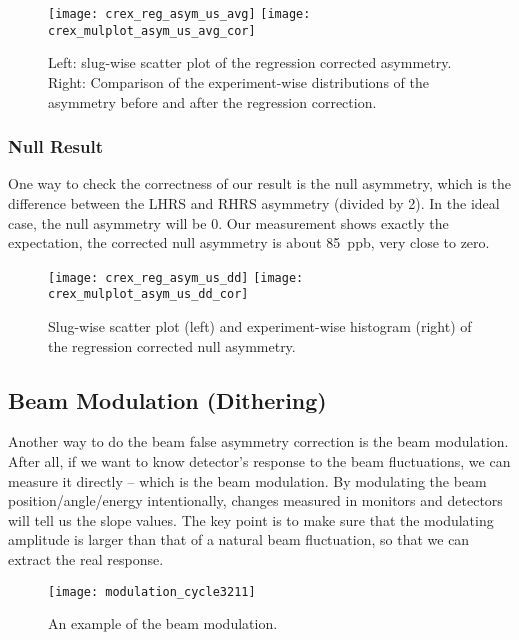 \begin{figure}[!h]
    \centering
    \texttt{[image: crex\_reg\_asym\_us\_avg]}
    \texttt{[image: crex\_mulplot\_asym\_us\_avg\_cor]}
    \caption{Left: slug-wise scatter plot of the regression corrected asymmetry.
    Right: Comparison of the experiment-wise distributions of the asymmetry 
    before and after the regression correction.}
    \label{fig:reg_asym_us_avg}
\end{figure}

\subsubsection{Null Result}
One way to check the correctness of our result is the null asymmetry, which
is the difference between the LHRS and RHRS asymmetry (divided by 2). 
In the ideal case, the null asymmetry will be 0. Our measurement shows exactly
the expectation, the corrected null asymmetry is about 85~ppb, very close
to zero.
\begin{figure}[!h]
    \centering
    \texttt{[image: crex\_reg\_asym\_us\_dd]}
    \texttt{[image: crex\_mulplot\_asym\_us\_dd\_cor]}
    \caption{Slug-wise scatter plot (left) and experiment-wise histogram (right) of the
    regression corrected null asymmetry.}
    \label{fig:reg_asym_us_dd}
\end{figure}

\subsection{Beam Modulation (Dithering)}
Another way to do the beam false asymmetry correction is the beam modulation. After
all, if we want to know detector's response to the beam fluctuations, we can measure
it directly -- which is the beam modulation. By modulating the beam position/angle/energy
intentionally, changes measured in monitors and detectors will tell us the slope values.
The key point is to make sure that the modulating amplitude is larger than that of a
natural beam fluctuation, so that we can extract the real response.

\begin{figure}
    \centering
    \texttt{[image: modulation\_cycle3211]}
    \caption{An example of the beam modulation.}
\end{figure}

